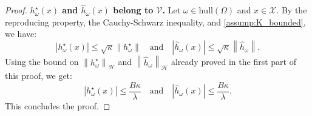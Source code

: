 \begin{proof}
\textbf{$h^\star_\omega(x)$ and $\hat{h}_\omega(x)$ belong to $\mathcal{V}$. }Let $\omega\in\text{hull}(\Omega)$ and $x\in\mathcal{X}$. By the reproducing property, the Cauchy-Schwarz inequality, and \cref{assump:K_bounded}, we have:
\begin{equation*}
    \left|h^\star_\omega(x)\right|\leq\sqrt{\kappa}\left\|h^\star_\omega\right\|\quad\text{and}\quad\left|\hat{h}_\omega(x)\right|\leq\sqrt{\kappa}\left\|\hat{h}_\omega\right\|.
\end{equation*}
Using the bound on $\left\|h^\star_\omega\right\|_\mathcal{H}$ and $\left\|\hat{h}_\omega\right\|_\mathcal{H}$ already proved in the first part of this proof, we get:
\begin{equation*}
    \left|h^\star_\omega(x)\right|\leq\frac{B\kappa}{\lambda}\quad\text{and}\quad\left|\hat{h}_\omega(x)\right|\leq\frac{B\kappa}{\lambda}.
\end{equation*}
This concludes the proof.
\end{proof}

